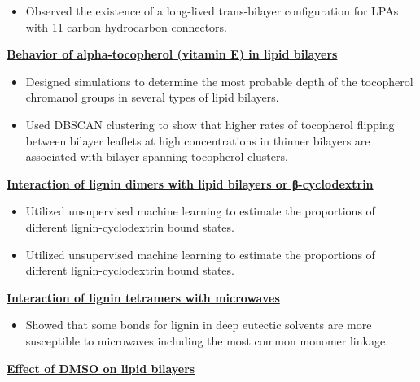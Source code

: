 \begin{cventries}
{\begin{cvitems}
\begin{itemize}
                \item {Observed the existence of a long-lived trans-bilayer configuration for LPAs with 11 carbon hydrocarbon connectors.}
                \end{itemize}
            \item {\textbf{\underline{Behavior of alpha-tocopherol (vitamin E) in lipid bilayers}}}
                \vspace{2pt}
                \begin{itemize}
                \item {Designed simulations to determine the most probable depth of the tocopherol chromanol groups in several types of lipid bilayers.}
                \item {Used DBSCAN clustering to show that higher rates of tocopherol flipping between bilayer leaflets at high concentrations in thinner bilayers are associated with bilayer spanning tocopherol clusters.}
                \end{itemize}
            \item {\textbf{\underline{Interaction of lignin dimers with lipid bilayers or β-cyclodextrin}}}
                \vspace{2pt}
                \begin{itemize}
                    \item {Utilized unsupervised machine learning to estimate the proportions of different lignin-cyclodextrin bound states.}
                    \item {Utilized unsupervised machine learning to estimate the proportions of different lignin-cyclodextrin bound states.}
                \end{itemize}            
            \item {\textbf{\underline{Interaction of lignin tetramers with microwaves}}}
                \vspace{2pt}
                \begin{itemize}
                    \item {Showed that some bonds for lignin in deep eutectic solvents are more susceptible to microwaves including the most common monomer linkage.}
                \end{itemize}   
            \item {\textbf{\underline{Effect of DMSO on lipid bilayers}}}

\end{cvitems}}
\end{cventries}
